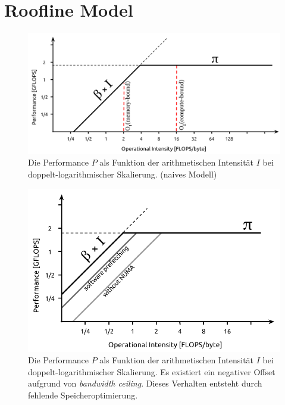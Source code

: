 		\newpage
		\section{Roofline Model}
		\begin{figure}[t]
		\centering
	    	\includegraphics[height=0.4\textwidth]{chapter1/pictures/roofline_model_0.png}
    		\caption[Roofline Modell - naiv]{Die Performance $P$ als Funktion der arithmetischen Intensität $I$ bei doppelt-logarithmischer Skalierung. (naives Modell) \autocite{wikiRLM}}
    		\label{1:rl0}
		\end{figure}

		\begin{figure}[t]
		\centering
	    	\includegraphics[height=0.4\textheight]{chapter1/pictures/roofline_model_1.png}
    		\caption[Roofline Modell - \textit{bandwidth ceiling}]{Die Performance $P$ als Funktion der arithmetischen Intensität $I$ bei doppelt-logarithmischer Skalierung. Es existiert ein negativer Offset aufgrund von \textit{bandwidth ceiling}. Dieses Verhalten entsteht durch fehlende Speicheroptimierung. \autocite{wikiRLM}}
    		\label{1:rl1}
		\end{figure}
	

